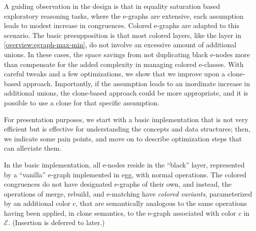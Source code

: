 A guiding observation in the design is that in equality saturation based exploratory reasoning tasks, where the e-graphs are extensive, each assumption leads to modest increase in congruences.
Colored e-graphs are adapted to this scenario.
The basic presupposition is that most colored layers, like the \cblue layer in \autoref{overview:egraph-max-min}, do not involve an excessive amount of additional unions.
In these cases, the space savings from not duplicating black e-nodes more than compensate for the added complexity in managing colored e-classes. 
With careful tweaks and a few optimizations, we show that we improve upon a clone-based approach.
Importantly, if the assumption leads to an inordinate increase in additional unions, the clone-based approach could be more appropriate, and it is possible to use a clone for that specific assumption.

\begin{comment}
And so, colored e-graphs and separate e-graphs are approaches that complement each other.
An obvious optimization is to automatically switch from a colored layer into a new separate e-graph on the fly.
This can potentially improve performance, but automatically detecting when it is useful, and then switching is something we leave for future work. 
\ES{TODO: we need to make sure we right about the inherent problems in the colored e-graph implementation when there are many changes (after the optimizations). then add this but with more detail: Although it might seems like a limitation, but actually we can always decide to drop a color, or explore it in a new separate E-Graph.}
\end{comment}

For presentation purposes, we start with a basic implementation that is not very efficient but is effective for understanding the concepts and data structures;
then, we indicate some pain points, and move on to describe optimization steps that can alleviate them.

In the basic implementation, all e-nodes reside in the ``black'' layer,  represented by a ``vanilla'' e-graph implemented in egg, with normal operations.
The colored congruences do not have designated e-graphs of their own, and instead, the operations of merge, rebuild, and e-matching have \emph{colored variants}, parameterized by an additional color $c$, that are semantically analogous to the same operations having been applied, in clone semantics, to the e-graph associated with color $c$ in $\mathcal{E}$.
(Insertion is deferred to later.)

